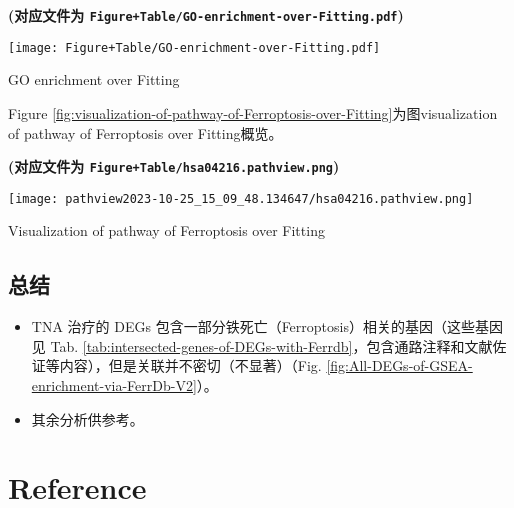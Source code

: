 \documentclass[
]{article}
\providecommand{\tightlist}{%
  \setlength{\itemsep}{0pt}\setlength{\parskip}{0pt}}
\begin{document}
\textbf{(对应文件为 \texttt{Figure+Table/GO-enrichment-over-Fitting.pdf})}

\def\@captype{figure}
\begin{center}
\texttt{[image: Figure+Table/GO-enrichment-over-Fitting.pdf]}
\caption{GO enrichment over Fitting}\label{fig:GO-enrichment-over-Fitting}
\end{center}

Figure \ref{fig:visualization-of-pathway-of-Ferroptosis-over-Fitting}为图visualization of pathway of Ferroptosis over Fitting概览。

\textbf{(对应文件为 \texttt{Figure+Table/hsa04216.pathview.png})}

\def\@captype{figure}
\begin{center}
\texttt{[image: pathview2023-10-25\_15\_09\_48.134647/hsa04216.pathview.png]}
\caption{Visualization of pathway of Ferroptosis over Fitting}\label{fig:visualization-of-pathway-of-Ferroptosis-over-Fitting}
\end{center}

\hypertarget{ux603bux7ed3}{%
\subsection{总结}\label{ux603bux7ed3}}

\begin{itemize}
\tightlist
\item
  TNA 治疗的 DEGs 包含一部分铁死亡（Ferroptosis）相关的基因（这些基因见 Tab. \ref{tab:intersected-genes-of-DEGs-with-Ferrdb}，包含通路注释和文献佐证等内容），但是关联并不密切（不显著）（Fig. \ref{fig:All-DEGs-of-GSEA-enrichment-via-FerrDb-V2}）。
\item
  其余分析供参考。
\end{itemize}

\hypertarget{bibliography}{%
\section*{Reference}\label{bibliography}}
\end{document}
